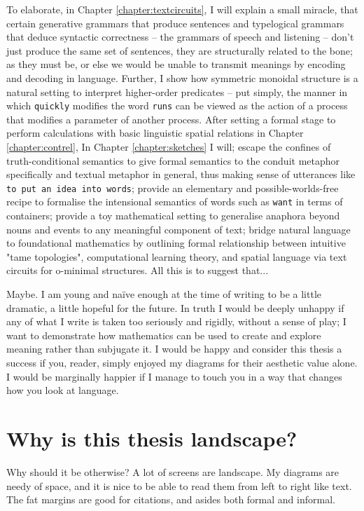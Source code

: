 To elaborate, in Chapter \ref{chapter:textcircuits}, I will explain a small miracle, that certain generative grammars that produce sentences and typelogical grammars that deduce syntactic correctness -- the grammars of speech and listening -- don't just produce the same set of sentences, they are structurally related to the bone; as they must be, or else we would be unable to transmit meanings by encoding and decoding in language. Further, I show how symmetric monoidal structure is a natural setting to interpret higher-order predicates -- put simply, the manner in which \texttt{quickly} modifies the word \texttt{runs} can be viewed as the action of a process that modifies a parameter of another process. After setting a formal stage to perform calculations with basic linguistic spatial relations in Chapter \ref{chapter:contrel}, In Chapter \ref{chapter:sketches} I will; escape the confines of truth-conditional semantics to give formal semantics to the conduit metaphor specifically and textual metaphor in general, thus making sense of utterances like \texttt{to put an idea into words}; provide an elementary and possible-worlds-free recipe to formalise the intensional semantics of words such as \texttt{want} in terms of containers; provide a toy mathematical setting to generalise anaphora beyond nouns and events to any meaningful component of text; bridge natural language to foundational mathematics by outlining formal relationship between intuitive "tame topologies", computational learning theory, and spatial language via text circuits for o-minimal structures. All this is to suggest that...

 Maybe. I am young and na\"{i}ve enough at the time of writing to be a little dramatic, a little hopeful for the future. In truth I would be deeply unhappy if any of what I write is taken too seriously and rigidly, without a sense of play; I want to demonstrate how mathematics can be used to create and explore meaning rather than subjugate it. I would be happy and consider this thesis a success if you, reader, simply enjoyed my diagrams for their aesthetic value alone. I would be marginally happier if I manage to touch you in a way that changes how you look at language.

\section{Why is this thesis landscape?} Why should it be otherwise? A lot of screens are landscape. My diagrams are needy of space, and it is nice to be able to read them from left to right like text. The fat margins are good for citations, and asides both formal and informal.
